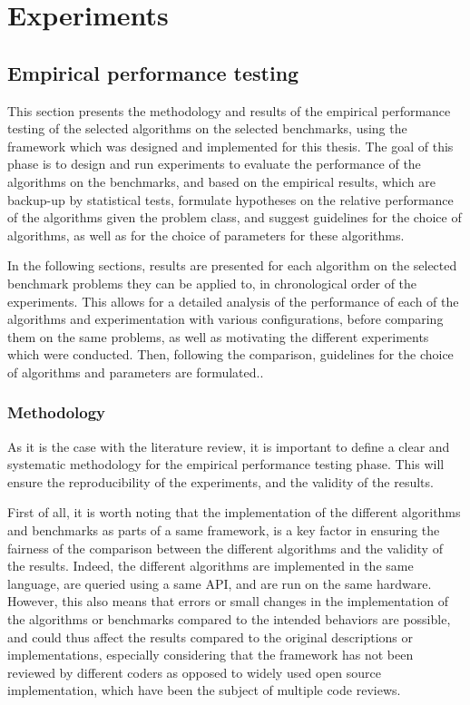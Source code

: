 \chapter{Experiments}
\label{chap:experiments}

\section{Empirical performance testing}

This section presents the methodology and results of the empirical performance testing of the selected algorithms on the selected benchmarks, using the framework which was designed and implemented for this thesis.
The goal of this phase is to design and run experiments to evaluate the performance of the algorithms on the benchmarks, and based on the empirical results, which are backup-up by statistical tests, formulate
hypotheses on the relative performance of the algorithms given the problem class, and suggest guidelines for the choice of algorithms, as well as for the choice of parameters for these algorithms.

In the following sections, results are presented for each algorithm on the selected benchmark problems they can be applied to, in chronological order of the experiments.
This allows for a detailed analysis of the performance of each of the algorithms and experimentation with various configurations, before comparing them on the same problems, as well as
motivating the different experiments which were conducted. Then, following the comparison, guidelines for the choice of algorithms and parameters are formulated..

\subsection{Methodology}

As it is the case with the literature review, it is important to define a clear and systematic methodology for the empirical performance testing phase. This will ensure the reproducibility of the experiments,
and the validity of the results.

First of all, it is worth noting that the implementation of the different algorithms and benchmarks as parts of a same framework, is a key factor in ensuring the fairness of the comparison between the different
algorithms and the validity of the results. Indeed, the different algorithms are implemented in the same language, are queried using a same API, and are run on the same hardware. However, this also means that
errors or small changes in the implementation of the algorithms or benchmarks compared to the intended behaviors are possible, and could thus affect the results compared to the original descriptions or implementations,
especially considering that the framework has not been reviewed by different coders as opposed to widely used open source implementation, which have been the subject of multiple code reviews.

